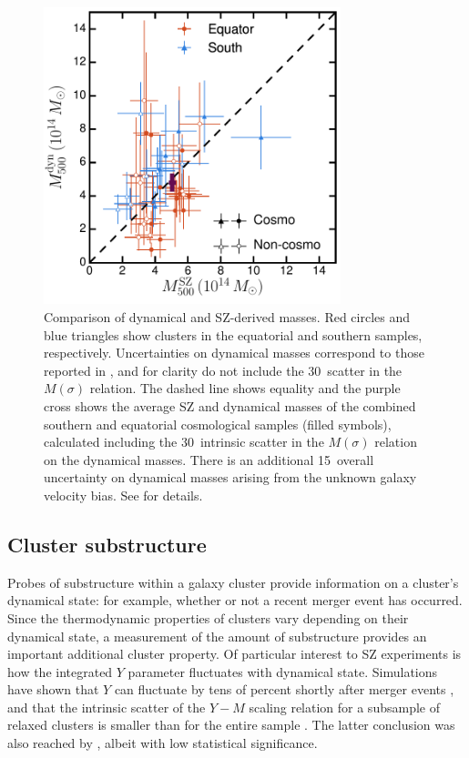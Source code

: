 \begin{figure}
 \centerline{\includegraphics[width=3.4in]{chapter3/mdyn_msz_final_dm14_fracerr_debiased.pdf}}
\caption{Comparison of dynamical and SZ-derived masses. Red circles and blue triangles show clusters in the equatorial and southern samples, respectively. Uncertainties on dynamical masses correspond to those reported in , and for clarity do not include the 30\percent\ scatter in the $M(\sigma)$ relation. The dashed line shows equality and the purple cross shows the average SZ and dynamical masses of the combined southern and equatorial cosmological samples (filled symbols), calculated including the 30\percent\ intrinsic scatter in the $M(\sigma)$ relation on the dynamical masses. There is an additional 15\percent\ overall uncertainty on dynamical masses arising from the unknown galaxy velocity bias. See  for details.}
\label{f:msz}
\end{figure}


\subsection{Cluster substructure}\label{s:substruct}

Probes of substructure within a galaxy cluster provide information on a cluster's dynamical state: 
for example, whether or not a recent merger event has occurred. Since the thermodynamic properties 
of clusters vary depending on their dynamical state, a measurement of the amount of substructure 
provides an important additional cluster property. Of particular interest to SZ experiments is how 
the integrated $Y$ parameter fluctuates with dynamical state. Simulations have shown that $Y$ can 
fluctuate by tens of percent shortly after merger events 
\cite[e.g.,][]{poole07,wik08,krause12,nelson12}, and that the intrinsic scatter of the $Y-M$ 
scaling relation for a subsample of relaxed clusters is smaller than for the entire sample 
\citep[e.g.,][]{battaglia12,yu15}. The latter conclusion was also reached by \cite{sifon13}, 
albeit with low statistical significance.


